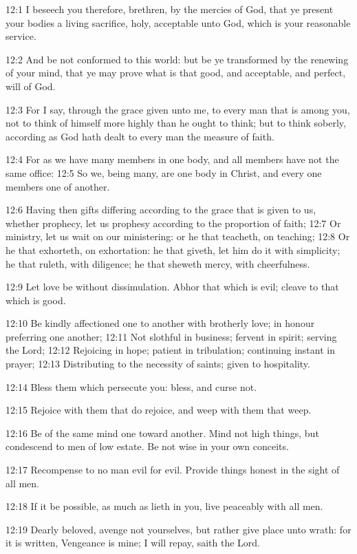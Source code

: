 12:1 I beseech you therefore, brethren, by the mercies of God, that ye present your bodies a living sacrifice, holy, acceptable unto God, which is your reasonable service.

12:2 And be not conformed to this world: but be ye transformed by the renewing of your mind, that ye may prove what is that good, and acceptable, and perfect, will of God.

12:3 For I say, through the grace given unto me, to every man that is among you, not to think of himself more highly than he ought to think; but to think soberly, according as God hath dealt to every man the measure of faith.

12:4 For as we have many members in one body, and all members have not the same office: 12:5 So we, being many, are one body in Christ, and every one members one of another.

12:6 Having then gifts differing according to the grace that is given to us, whether prophecy, let us prophesy according to the proportion of faith; 12:7 Or ministry, let us wait on our ministering: or he that teacheth, on teaching; 12:8 Or he that exhorteth, on exhortation: he that giveth, let him do it with simplicity; he that ruleth, with diligence; he that sheweth mercy, with cheerfulness.

12:9 Let love be without dissimulation. Abhor that which is evil; cleave to that which is good.

12:10 Be kindly affectioned one to another with brotherly love; in honour preferring one another; 12:11 Not slothful in business; fervent in spirit; serving the Lord; 12:12 Rejoicing in hope; patient in tribulation; continuing instant in prayer; 12:13 Distributing to the necessity of saints; given to hospitality.

12:14 Bless them which persecute you: bless, and curse not.

12:15 Rejoice with them that do rejoice, and weep with them that weep.

12:16 Be of the same mind one toward another. Mind not high things, but condescend to men of low estate. Be not wise in your own conceits.

12:17 Recompense to no man evil for evil. Provide things honest in the sight of all men.

12:18 If it be possible, as much as lieth in you, live peaceably with all men.

12:19 Dearly beloved, avenge not yourselves, but rather give place unto wrath: for it is written, Vengeance is mine; I will repay, saith the Lord.

